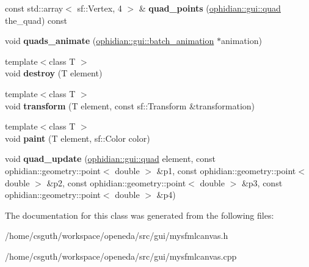 \begin{DoxyCompactItemize}
\item 
\hypertarget{classuddac2016_1_1mysfmlcanvas_a2c03706aafbcf889f90e131f6d3766ac}{const std\-::array$<$ sf\-::\-Vertex, 4 $>$ \& {\bfseries quad\-\_\-points} (\hyperlink{structophidian_1_1gui_1_1quad}{ophidian\-::gui\-::quad} the\-\_\-quad) const }\label{classuddac2016_1_1mysfmlcanvas_a2c03706aafbcf889f90e131f6d3766ac}

\item 
\hypertarget{classuddac2016_1_1mysfmlcanvas_aace8fc71cf312846a4b98d5da64559ff}{void {\bfseries quads\-\_\-animate} (\hyperlink{classophidian_1_1gui_1_1batch__animation}{ophidian\-::gui\-::batch\-\_\-animation} $\ast$animation)}\label{classuddac2016_1_1mysfmlcanvas_aace8fc71cf312846a4b98d5da64559ff}

\item 
\hypertarget{classuddac2016_1_1mysfmlcanvas_a85e0734b97e6d345a6ec446525a2f113}{{\footnotesize template$<$class T $>$ }\\void {\bfseries destroy} (T element)}\label{classuddac2016_1_1mysfmlcanvas_a85e0734b97e6d345a6ec446525a2f113}

\item 
\hypertarget{classuddac2016_1_1mysfmlcanvas_a6e22111490bc988dfd7916d94248f800}{{\footnotesize template$<$class T $>$ }\\void {\bfseries transform} (T element, const sf\-::\-Transform \&transformation)}\label{classuddac2016_1_1mysfmlcanvas_a6e22111490bc988dfd7916d94248f800}

\item 
\hypertarget{classuddac2016_1_1mysfmlcanvas_a3c41e232f34d3db79d46b58d44097aad}{{\footnotesize template$<$class T $>$ }\\void {\bfseries paint} (T element, sf\-::\-Color color)}\label{classuddac2016_1_1mysfmlcanvas_a3c41e232f34d3db79d46b58d44097aad}

\item 
\hypertarget{classuddac2016_1_1mysfmlcanvas_a2e4375de5eb70e830159da232ab7810c}{void {\bfseries quad\-\_\-update} (\hyperlink{structophidian_1_1gui_1_1quad}{ophidian\-::gui\-::quad} element, const ophidian\-::geometry\-::point$<$ double $>$ \&p1, const ophidian\-::geometry\-::point$<$ double $>$ \&p2, const ophidian\-::geometry\-::point$<$ double $>$ \&p3, const ophidian\-::geometry\-::point$<$ double $>$ \&p4)}\label{classuddac2016_1_1mysfmlcanvas_a2e4375de5eb70e830159da232ab7810c}

\end{DoxyCompactItemize}


The documentation for this class was generated from the following files\-:\begin{DoxyCompactItemize}
\item 
/home/csguth/workspace/openeda/src/gui/mysfmlcanvas.\-h\item 
/home/csguth/workspace/openeda/src/gui/mysfmlcanvas.\-cpp\end{DoxyCompactItemize}
